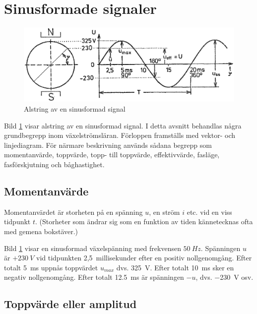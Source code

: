 \section{Sinusformade signaler}

\begin{figure}[ht]
\includegraphics[width=\textwidth]{images/cropped_pdfs/bild_2_1-16.pdf}
\caption{Alstring av en sinusformad signal}
\label{fig:BildII1-16}
\end{figure}

Bild \ref{fig:BildII1-16} visar alstring av en sinusformad signal.
I detta avsnitt behandlas några grundbegrepp inom växelströmsläran.
Förloppen framställs med vektor- och linjediagram.
För närmare beskrivning används sådana begrepp som momentanvärde,
toppvärde, topp- till toppvärde, effektivvärde, fasläge, fasförskjutning och
båghastighet.

\subsection{Momentanvärde}

Momentanvärdet är storheten på en spänning \(u\), en ström \(i\) etc. vid en
viss tidpunkt \(t\).
(Storheter som ändrar sig som en funktion av tiden kännetecknas ofta med gemena
bokstäver.)

Bild \ref{fig:BildII1-16} visar en sinusformad växelspänning med frekvensen
\(50\ Hz\).
Spänningen \(u\) är \(+230\ V\) vid tidpunkten 2,5~millisekunder efter en
positiv nollgenomgång.
Efter totalt \SI{5}{ms} uppnås toppvärdet \(u_{max}\) dvs. \SI{+325}{V}.
Efter totalt \SI{10}{ms} sker en negativ nollgenomgång.
Efter totalt \SI{12,5}{ms} är spänningen \(-u\), dvs. \SI{-230}{V} osv.

\subsection{Toppvärde eller amplitud}

